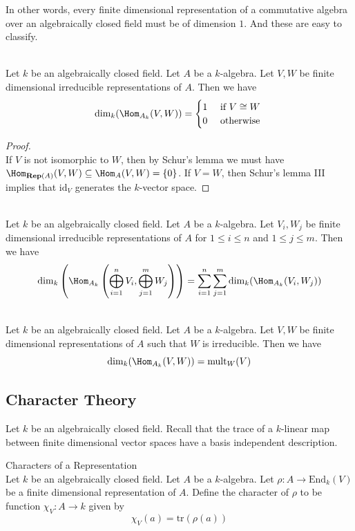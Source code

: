 \documentclass[a4paper]{article}
\begin{document}
In other words, every finite dimensional representation of a commutative algebra over an algebraically closed field must be of dimension $1$. And these are easy to classify. 

\begin{prp}{}{}\\
Let $k$ be an algebraically closed field. Let $A$ be a $k$-algebra. Let $V,W$ be finite dimensional irreducible representations of $A$. Then we have $$\dim_k(\Hom_{A_k}(V,W))=\begin{cases}
1 & \text{ if }V\cong W\\
0 & \text{ otherwise }
\end{cases}$$
\begin{proof}\\
If $V$ is not isomorphic to $W$, then by Schur's lemma we must have $\Hom_{\bold{Rep}(A)}(V,W)\subseteq\Hom_A(V,W)=\{0\}$. If $V=W$, then Schur's lemma III implies that $\text{id}_V$ generates the $k$-vector space. 
\end{proof}
\end{prp}

\begin{prp}{}{}\\
Let $k$ be an algebraically closed field. Let $A$ be a $k$-algebra. Let $V_i,W_j$ be finite dimensional irreducible representations of $A$ for $1\leq i\leq n$ and $1\leq j\leq m$. Then we have $$\dim_k\left(\Hom_{A_k}\left(\bigoplus_{i=1}^nV_i,\bigoplus_{j=1}^mW_j\right)\right)=\sum_{i=1}^n\sum_{j=1}^m\dim_k(\Hom_{A_k}(V_i,W_j))$$
\end{prp}

\begin{crl}{}{}\\
Let $k$ be an algebraically closed field. Let $A$ be a $k$-algebra. Let $V,W$ be finite dimensional representations of $A$ such that $W$ is irreducible. Then we have $$\dim_k(\Hom_{A_k}(V,W))=\text{mult}_W(V)$$
\end{crl}

\subsection{Character Theory}
Let $k$ be an algebraically closed field. Recall that the trace of a $k$-linear map between finite dimensional vector spaces have a basis independent description. 

\begin{defn}{Characters of a Representation}{}\\
Let $k$ be an algebraically closed field. Let $A$ be a $k$-algebra. Let $\rho:A\to\text{End}_k(V)$ be a finite dimensional representation of $A$. Define the character of $\rho$ to be function $\chi_V:A\to k$ given by $$\chi_V(a)=\text{tr}(\rho(a))$$
\end{defn}
\end{document}

